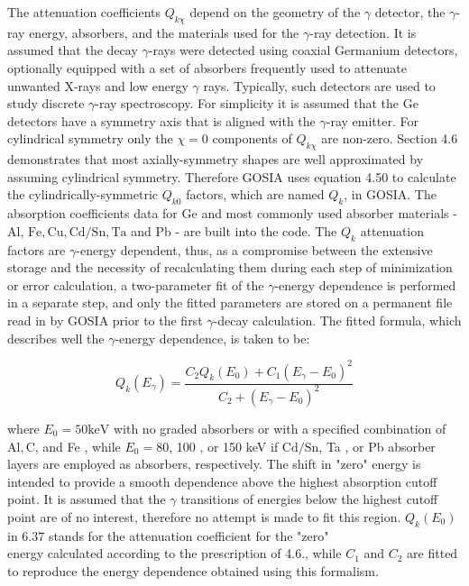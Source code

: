 \documentclass[10pt]{article}
\begin{document}
The attenuation coefficients $Q_{k \chi}$ depend on the geometry of the $\gamma$ detector, the $\gamma$-ray energy, absorbers, and the materials used for the $\gamma$-ray detection. It is assumed that the decay $\gamma$-rays were detected using coaxial Germanium detectors, optionally equipped with a set of absorbers frequently used to attenuate unwanted X-rays and low energy $\gamma$ rays. Typically, such detectors are used to study discrete $\gamma$-ray spectroscopy. For simplicity it is assumed that the Ge detectors have a symmetry axis that is aligned with the $\gamma$-ray emitter. For cylindrical symmetry only the $\chi=0$ components of $Q_{k \chi}$ are non-zero. Section 4.6 demonstrates that most axially-symmetry shapes are well approximated by assuming cylindrical symmetry. Therefore GOSIA uses equation 4.50 to calculate the cylindrically-symmetric $Q_{k 0}$ factors, which are named $Q_{k}$, in GOSIA. The absorption coefficients data for Ge and most commonly used absorber materials - Al, $\mathrm{Fe}, \mathrm{Cu}, \mathrm{Cd} / \mathrm{Sn}, \mathrm{Ta}$ and Pb - are built into the code. The $Q_{k}$ attenuation factors are $\gamma$-energy dependent, thus, as a compromise between the extensive storage and the necessity of recalculating them during each step of minimization or error calculation, a two-parameter fit of the $\gamma$-energy dependence is performed in a separate step, and only the fitted parameters are stored on a permanent file read in by GOSIA prior to the first $\gamma$-decay calculation. The fitted formula, which describes well the $\gamma$-energy dependence, is taken to be:


\begin{equation*}
Q_{k}\left(E_{\gamma}\right)=\frac{C_{2} Q_{k}\left(E_{0}\right)+C_{1}\left(E_{\gamma}-E_{0}\right)^{2}}{C_{2}+\left(E_{\gamma}-E_{0}\right)^{2}} \tag{6.37}
\end{equation*}


where $E_{0}=50 \mathrm{keV}$ with no graded absorbers or with a specified combination of $\mathrm{Al}, \mathrm{C}$, and Fe , while $E_{0}=80$, 100 , or 150 keV if $\mathrm{Cd} / \mathrm{Sn}$, Ta , or Pb absorber layers are employed as absorbers, respectively. The shift in "zero" energy is intended to provide a smooth dependence above the highest absorption cutoff point. It is assumed that the $\gamma$ transitions of energies below the highest cutoff point are of no interest, therefore no attempt is made to fit this region. $Q_{k}\left(E_{0}\right)$ in 6.37 stands for the attenuation coefficient for the "zero"\\
energy calculated according to the prescription of 4.6., while $C_{1}$ and $C_{2}$ are fitted to reproduce the energy dependence obtained using this formalism.
\end{document}
